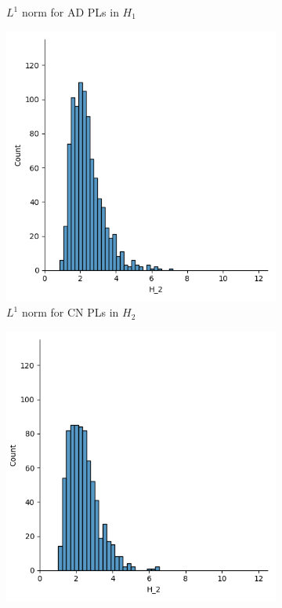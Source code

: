 \documentclass{article}
\begin{document}
\begin{figure}
\begin{subfigure}{0.32\textwidth}
    \caption{$L^1$ norm for AD PLs in $H_1$}
  \end{subfigure}
  \begin{subfigure}{0.32\textwidth}
    \includegraphics[width=\textwidth]{figures/median_pls/median_pl_CN_H_2.png}
    \caption{$L^1$ norm for CN PLs in $H_2$}
  \end{subfigure}
  \begin{subfigure}{0.32\textwidth}
    \includegraphics[width=\textwidth]{figures/median_pls/median_pl_MCI_H_2.png}

\end{subfigure}
\end{figure}
\end{document}
